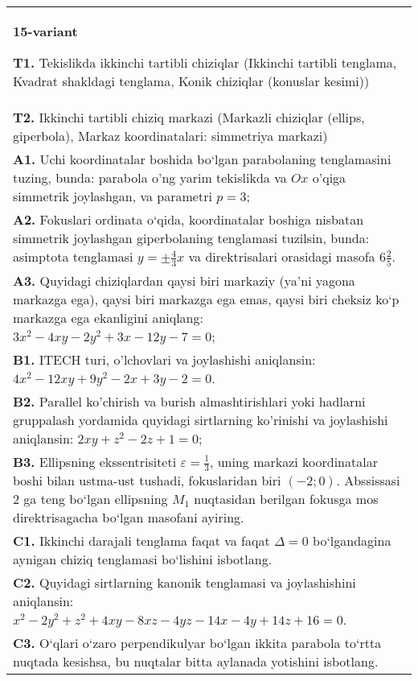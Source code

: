 \documentclass{article}
\begin{document}
\begin{tabular}{m{17cm}}
\textbf{15-variant}
\newline

\textbf{T1.} Tekislikda ikkinchi tartibli chiziqlar (Ikkinchi tartibli tenglama, Kvadrat shakldagi tenglama, Konik chiziqlar (konuslar kesimi)) \\
\textbf{T2.} Ikkinchi tartibli chiziq markazi (Markazli chiziqlar (ellips, giperbola), Markaz koordinatalari: simmetriya markazi) \\
\textbf{A1.} Uchi koordinatalar boshida bo‘lgan parabolaning tenglamasini tuzing, bunda: parabola o'ng yarim tekislikda va $Ox$ o'qiga simmetrik joylashgan, va parametri $p=3$; \\
\textbf{A2.} Fokuslari ordinata o‘qida, koordinatalar boshiga nisbatan simmetrik joylashgan giperbolaning tenglamasi tuzilsin, bunda: asimptota tenglamasi $y= \pm \frac{4}{3} x$ va direktrisalari orasidagi masofa $6 \frac{2}{5}$. \\
\textbf{A3.} Quyidagi chiziqlardan qaysi biri markaziy (ya’ni yagona markazga ega), qaysi biri markazga ega emas, qaysi biri cheksiz ko‘p markazga ega ekanligini aniqlang: $3 x^2-4 x y-2 y^2+3 x-12 y-7=0$; \\
\textbf{B1.} ITECH turi, o'lchovlari va joylashishi aniqlansin: $4 x^2-12 x y+9 y^2-2 x+3 y-2=0$. \\
\textbf{B2.} Parallel ko'chirish va burish almashtirishlari yoki hadlarni gruppalash yordamida quyidagi sirtlarning ko'rinishi va joylashishi aniqlansin: $2 x y+z^2-2 z+1=0$; \\
\textbf{B3.} Ellipsning ekssentrisiteti $\varepsilon=\frac{1}{3}$, uning markazi koordinatalar boshi bilan ustma-ust tushadi, fokuslaridan biri $ (-2; 0) $. Abssissasi 2 ga teng bo‘lgan ellipsning $M_1$ nuqtasidan berilgan fokusga mos direktrisagacha bo‘lgan masofani ayiring. \\
\textbf{C1.} Ikkinchi darajali tenglama faqat va faqat $\Delta=0$ bo‘lgandagina aynigan chiziq tenglamasi bo‘lishini isbotlang. \\
\textbf{C2.} Quyidagi sirtlarning kanonik tenglamasi va joylashishini aniqlansin: $x^2-2 y^2+z^2+4 x y-8 x z-4 y z-14 x-4 y+14 z+16=0$. \\
\textbf{C3.} O‘qlari o‘zaro perpendikulyar bo‘lgan ikkita parabola to‘rtta nuqtada kesishsa, bu nuqtalar bitta aylanada yotishini isbotlang. \\

\end{tabular}
\vspace{1cm}
\end{document}
